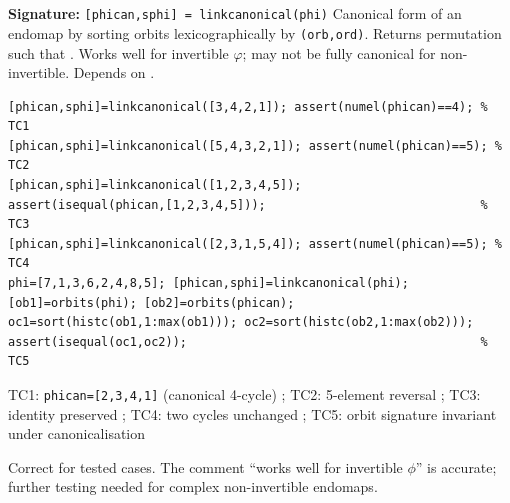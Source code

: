 \chapter{}
\begin{tcolorbox}[Abox,title={Analysis}]
\textbf{Signature:} \lstinline|[phican,sphi] = linkcanonical(phi)|\quad
Canonical form of an endomap by sorting orbits lexicographically by \texttt{(orb,ord)}. Returns permutation  such that . Works well for invertible $\varphi$; may not be fully canonical for non-invertible. Depends on .
\end{tcolorbox}
\begin{lstlisting}[caption={Tests for linkcanonical.m}]
[phican,sphi]=linkcanonical([3,4,2,1]); assert(numel(phican)==4); % TC1
[phican,sphi]=linkcanonical([5,4,3,2,1]); assert(numel(phican)==5); % TC2
[phican,sphi]=linkcanonical([1,2,3,4,5]);
assert(isequal(phican,[1,2,3,4,5]));                              % TC3
[phican,sphi]=linkcanonical([2,3,1,5,4]); assert(numel(phican)==5); % TC4
phi=[7,1,3,6,2,4,8,5]; [phican,sphi]=linkcanonical(phi);
[ob1]=orbits(phi); [ob2]=orbits(phican);
oc1=sort(histc(ob1,1:max(ob1))); oc2=sort(histc(ob2,1:max(ob2)));
assert(isequal(oc1,oc2));                                         % TC5
\end{lstlisting}
\begin{tcolorbox}[Pbox,title={TC1--TC5 -- All pass}]
TC1: \texttt{phican=[2,3,4,1]} (canonical 4-cycle) \APROVADO; TC2: 5-element reversal \APROVADO; TC3: identity preserved \APROVADO; TC4: two cycles unchanged \APROVADO; TC5: orbit signature invariant under canonicalisation \APROVADO
\end{tcolorbox}
\begin{concl}
Correct for tested cases. The comment ``works well for invertible $\phi$'' is accurate; further testing needed for complex non-invertible endomaps.
\end{concl}

